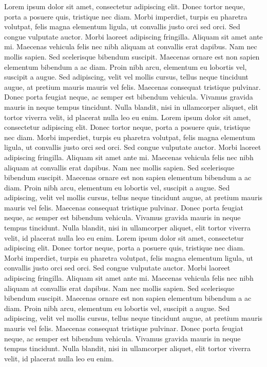 \documentclass[a4paper,12pt,oneside]{report}
\let\openright=\clearpage
\begin{document}
\newpage


\openright
\pagestyle{plain}
\setcounter{page}{1}
\tableofcontents

\newpage
Lorem ipsum dolor sit amet, consectetur adipiscing elit. Donec tortor neque, porta a posuere quis, tristique nec diam. Morbi imperdiet, turpis eu pharetra volutpat, felis magna elementum ligula, ut convallis justo orci sed orci. Sed congue vulputate auctor. Morbi laoreet adipiscing fringilla. Aliquam sit amet ante mi. Maecenas vehicula felis nec nibh aliquam at convallis erat dapibus. Nam nec mollis sapien. Sed scelerisque bibendum suscipit. Maecenas ornare est non sapien elementum bibendum a ac diam. Proin nibh arcu, elementum eu lobortis vel, suscipit a augue. Sed adipiscing, velit vel mollis cursus, tellus neque tincidunt augue, at pretium mauris mauris vel felis. Maecenas consequat tristique pulvinar. Donec porta feugiat neque, ac semper est bibendum vehicula. Vivamus gravida mauris in neque tempus tincidunt. Nulla blandit, nisi in ullamcorper aliquet, elit tortor viverra velit, id placerat nulla leo eu enim.
Lorem ipsum dolor sit amet, consectetur adipiscing elit. Donec tortor neque, porta a posuere quis, tristique nec diam. Morbi imperdiet, turpis eu pharetra volutpat, felis magna elementum ligula, ut convallis justo orci sed orci. Sed congue vulputate auctor. Morbi laoreet adipiscing fringilla. Aliquam sit amet ante mi. Maecenas vehicula felis nec nibh aliquam at convallis erat dapibus. Nam nec mollis sapien. Sed scelerisque bibendum suscipit. Maecenas ornare est non sapien elementum bibendum a ac diam. Proin nibh arcu, elementum eu lobortis vel, suscipit a augue. Sed adipiscing, velit vel mollis cursus, tellus neque tincidunt augue, at pretium mauris mauris vel felis. Maecenas consequat tristique pulvinar. Donec porta feugiat neque, ac semper est bibendum vehicula. Vivamus gravida mauris in neque tempus tincidunt. Nulla blandit, nisi in ullamcorper aliquet, elit tortor viverra velit, id placerat nulla leo eu enim.
Lorem ipsum dolor sit amet, consectetur adipiscing elit. Donec tortor neque, porta a posuere quis, tristique nec diam. Morbi imperdiet, turpis eu pharetra volutpat, felis magna elementum ligula, ut convallis justo orci sed orci. Sed congue vulputate auctor. Morbi laoreet adipiscing fringilla. Aliquam sit amet ante mi. Maecenas vehicula felis nec nibh aliquam at convallis erat dapibus. Nam nec mollis sapien. Sed scelerisque bibendum suscipit. Maecenas ornare est non sapien elementum bibendum a ac diam. Proin nibh arcu, elementum eu lobortis vel, suscipit a augue. Sed adipiscing, velit vel mollis cursus, tellus neque tincidunt augue, at pretium mauris mauris vel felis. Maecenas consequat tristique pulvinar. Donec porta feugiat neque, ac semper est bibendum vehicula. Vivamus gravida mauris in neque tempus tincidunt. Nulla blandit, nisi in ullamcorper aliquet, elit tortor viverra velit, id placerat nulla leo eu enim.
\end{document}
